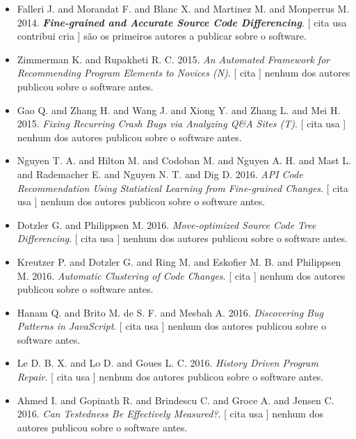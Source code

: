 \begin{itemize}
\item Falleri J. and Morandat F. and Blanc X. and Martinez M. and Monperrus M.
      2014.
        \textbf{\textit{ Fine-grained and Accurate Source Code Differencing}}.
      [
          cita
          usa
          contribui
          cria
      ]
são os primeiros autores a publicar sobre o software.
\item Zimmerman K. and Rupakheti R. C.
      2015.
        \textit{ An Automated Framework for Recommending Program Elements to Novices (N)}.
      [
          cita
      ]
nenhum dos autores publicou sobre o software antes.
\item Gao Q. and Zhang H. and Wang J. and Xiong Y. and Zhang L. and Mei H.
      2015.
        \textit{ Fixing Recurring Crash Bugs via Analyzing Q\&A Sites (T)}.
      [
          cita
          usa
      ]
nenhum dos autores publicou sobre o software antes.
\item Nguyen T. A. and Hilton M. and Codoban M. and Nguyen A. H. and Mast L. and Rademacher E. and Nguyen N. T. and Dig D.
      2016.
        \textit{ API Code Recommendation Using Statistical Learning from Fine-grained Changes}.
      [
          cita
          usa
      ]
nenhum dos autores publicou sobre o software antes.
\item Dotzler G. and Philippsen M.
      2016.
        \textit{ Move-optimized Source Code Tree Differencing}.
      [
          cita
          usa
      ]
nenhum dos autores publicou sobre o software antes.
\item Kreutzer P. and Dotzler G. and Ring M. and Eskofier M. B. and Philippsen M.
      2016.
        \textit{ Automatic Clustering of Code Changes}.
      [
          cita
      ]
nenhum dos autores publicou sobre o software antes.
\item Hanam Q. and Brito M. de S. F. and Mesbah A.
      2016.
        \textit{ Discovering Bug Patterns in JavaScript}.
      [
          cita
          usa
      ]
nenhum dos autores publicou sobre o software antes.
\item Le D. B. X. and Lo D. and Goues L. C.
      2016.
        \textit{ History Driven Program Repair}.
      [
          cita
          usa
      ]
nenhum dos autores publicou sobre o software antes.
\item Ahmed I. and Gopinath R. and Brindescu C. and Groce A. and Jensen C.
      2016.
        \textit{ Can Testedness Be Effectively Measured?}.
      [
          cita
          usa
      ]
nenhum dos autores publicou sobre o software antes.

\end{itemize}
